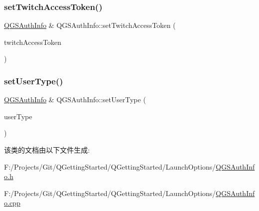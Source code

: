 \mbox{\label{class_q_g_s_auth_info_aaaaf3569cd3e9beb667ceaa52478dcab}} 
\subsubsection{\texorpdfstring{set\+Twitch\+Access\+Token()}{setTwitchAccessToken()}}
{\footnotesize\ttfamily \mbox{\hyperlink{class_q_g_s_auth_info}{Q\+G\+S\+Auth\+Info}} \& Q\+G\+S\+Auth\+Info\+::set\+Twitch\+Access\+Token (\begin{DoxyParamCaption}\item[{const Q\+String \&}]{twitch\+Access\+Token }\end{DoxyParamCaption})}

\mbox{\label{class_q_g_s_auth_info_a93130d306eb0440ddfd1e573e781954c}} 
\subsubsection{\texorpdfstring{set\+User\+Type()}{setUserType()}}
{\footnotesize\ttfamily \mbox{\hyperlink{class_q_g_s_auth_info}{Q\+G\+S\+Auth\+Info}} \& Q\+G\+S\+Auth\+Info\+::set\+User\+Type (\begin{DoxyParamCaption}\item[{const Q\+String \&}]{user\+Type }\end{DoxyParamCaption})}



该类的文档由以下文件生成\+:\begin{DoxyCompactItemize}
\item 
F\+:/\+Projects/\+Git/\+Q\+Getting\+Started/\+Q\+Getting\+Started/\+Launch\+Options/\mbox{\hyperlink{_q_g_s_auth_info_8h}{Q\+G\+S\+Auth\+Info.\+h}}\item 
F\+:/\+Projects/\+Git/\+Q\+Getting\+Started/\+Q\+Getting\+Started/\+Launch\+Options/\mbox{\hyperlink{_q_g_s_auth_info_8cpp}{Q\+G\+S\+Auth\+Info.\+cpp}}\end{DoxyCompactItemize}
